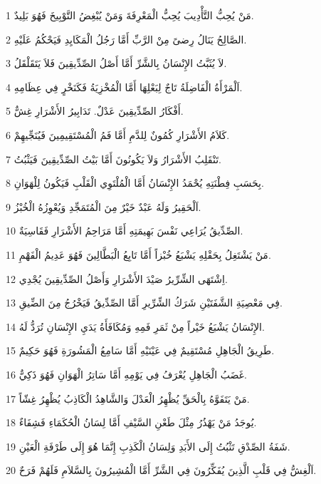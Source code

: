 \par 1 مَنْ يُحِبُّ التَّأْدِيبَ يُحِبُّ الْمَعْرِفَةَ وَمَنْ يُبْغِضُ التَّوْبِيخَ فَهُوَ بَلِيدٌ.
\par 2 الصَّالِحُ يَنَالُ رِضىً مِنْ الرَّبِّ أَمَّا رَجُلُ الْمَكَايِدِ فَيَحْكُمُ عَلَيْهِ.
\par 3 لاَ يُثَبَّتُ الإِنْسَانُ بِالشَّرِّ أَمَّا أَصْلُ الصِّدِّيقِينَ فَلاَ يَتَقَلْقَلُ.
\par 4 اَلْمَرْأَةُ الْفَاضِلَةُ تَاجٌ لِبَعْلِهَا أَمَّا الْمُخْزِيَةُ فَكَنَخْرٍ فِي عِظَامِهِ.
\par 5 أَفْكَارُ الصِّدِّيقِينَ عَدْلٌ. تَدَابِيرُ الأَشْرَارِ غِشٌّ.
\par 6 كَلاَمُ الأَشْرَارِ كُمُونٌ لِلدَّمِ أَمَّا فَمُ الْمُسْتَقِيمِينَ فَيُنَجِّيهِمْ.
\par 7 تَنْقَلِبُ الأَشْرَارُ وَلاَ يَكُونُونَ أَمَّا بَيْتُ الصِّدِّيقِينَ فَيَثْبُتُ.
\par 8 بِحَسَبِ فِطْنَتِهِ يُحْمَدُ الإِنْسَانُ أَمَّا الْمُلْتَوِي الْقَلْبِ فَيَكُونُ لِلْهَوَانِ.
\par 9 اَلْحَقِيرُ وَلَهُ عَبْدٌ خَيْرٌ مِنَ الْمُتَمَجِّدِ وَيُعْوِزُهُ الْخُبْزُ.
\par 10 الصِّدِّيقُ يُرَاعِي نَفْسَ بَهِيمَتِهِ أَمَّا مَرَاحِمُ الأَشْرَارِ فَقَاسِيَةٌ.
\par 11 مَنْ يَشْتَغِلُ بِحَقْلِهِ يَشْبَعُ خُبْزاً أَمَّا تَابِعُ الْبَطَّالِينَ فَهُوَ عَدِيمُ الْفَهْمِ.
\par 12 اِشْتَهَى الشِّرِّيرُ صَيْدَ الأَشْرَارِ وَأَصْلُ الصِّدِّيقِينَ يُجْدِي.
\par 13 فِي مَعْصِيَةِ الشَّفَتَيْنِ شَرَكُ الشِّرِّيرِ أَمَّا الصِّدِّيقُ فَيَخْرُجُ مِنَ الضِّيقِ.
\par 14 الإِنْسَانُ يَشْبَعُ خَيْراً مِنْ ثَمَرِ فَمِهِ وَمُكَافَأَةُ يَدَيِ الإِنْسَانِ تُرَدُّ لَهُ.
\par 15 طَرِيقُ الْجَاهِلِ مُسْتَقِيمٌ فِي عَيْنَيْهِ أَمَّا سَامِعُ الْمَشُورَةِ فَهُوَ حَكِيمٌ.
\par 16 غَضَبُ الْجَاهِلِ يُعْرَفُ فِي يَوْمِهِ أَمَّا سَاتِرُ الْهَوَانِ فَهُوَ ذَكِيٌّ.
\par 17 مَنْ يَتَفَوَّهُ بِالْحَقِّ يُظْهِرُ الْعَدْلَ وَالشَّاهِدُ الْكَاذِبُ يُظْهِرُ غِشّاً.
\par 18 يُوجَدُ مَنْ يَهْذُرُ مِثْلَ طَعْنِ السَّيْفِ أَمَّا لِسَانُ الْحُكَمَاءِ فَشِفَاءٌ.
\par 19 شَفَةُ الصِّدْقِ تَثْبُتُ إِلَى الأَبَدِ وَلِسَانُ الْكَذِبِ إِنَّمَا هُوَ إِلَى طَرْفَةِ الْعَيْنِ.
\par 20 اَلْغِشُّ فِي قَلْبِ الَّذِينَ يُفَكِّرُونَ فِي الشَّرِّ أَمَّا الْمُشِيرُونَ بِالسَّلاَمِ فَلَهُمْ فَرَحٌ.
